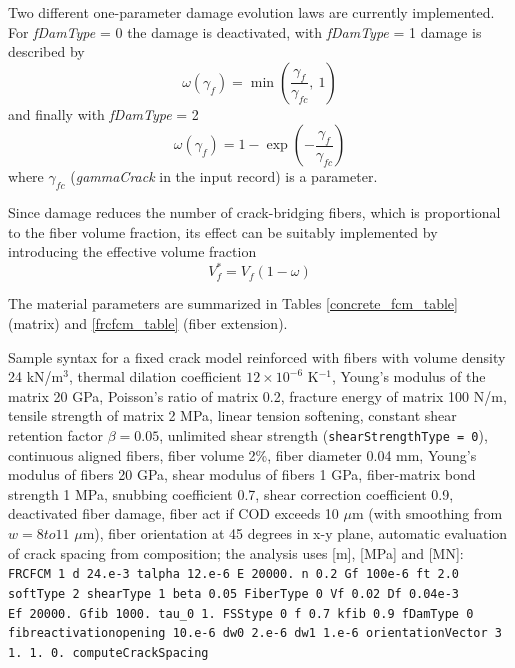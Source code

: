 \documentclass[a4paper]{article}
\newcommand{\param}[1]{{\it #1}}
\begin{document}
Two different one-parameter damage evolution laws are currently implemented. For \param{fDamType} = 0 the damage is deactivated, with \param{fDamType} = 1 damage is described by
\begin{equation}
  \omega(\gamma_f) = \min \left( \frac{\gamma_f}{\gamma_{fc}},\: 1 \right)
\end{equation}
and finally with \param{fDamType} = 2
\begin{equation}
  \omega(\gamma_f) = 1 - \exp \left( - \frac{\gamma_f}{\gamma_{fc}} \right)
\end{equation}
%
where $\gamma_{fc}$ (\param{gammaCrack} in the input record) is a parameter.

 Since damage reduces the number of crack-bridging fibers, which is proportional to the fiber volume fraction, its effect can be suitably implemented by introducing the effective volume fraction
%
\begin{equation}
V_f^{\ast} = V_f (1-\omega)
\end{equation}



The material parameters are summarized in Tables \ref{concrete_fcm_table} (matrix) and \ref{frcfcm_table} (fiber extension).

Sample syntax for a fixed crack model reinforced with fibers with volume density 24 kN/m$^3$, thermal dilation coefficient $12\times10^{-6}$ K$^{-1}$, Young's modulus of the matrix 20 GPa, Poisson's ratio of matrix 0.2, fracture energy of matrix 100 N/m, tensile strength of matrix 2 MPa, linear tension softening, constant shear retention factor $\beta = 0.05$, unlimited shear strength (\texttt{shearStrengthType = 0}), continuous aligned fibers, fiber volume 2\%, fiber diameter 0.04 mm, Young's modulus of fibers 20 GPa, shear modulus of fibers 1 GPa, fiber-matrix bond strength 1 MPa, snubbing coefficient 0.7, shear correction coefficient 0.9, deactivated fiber damage, fiber act if COD exceeds 10 $\mu$m (with smoothing from $w = 8 to 11$ $\mu$m), fiber orientation at 45 degrees in x-y plane, automatic evaluation of crack spacing from composition; the analysis uses [m], [MPa] and [MN]:\\
\texttt{FRCFCM 1 d 24.e-3 talpha 12.e-6 E 20000.~n 0.2 Gf 100e-6 ft 2.0 \\softType 2 shearType 1 beta 0.05 FiberType 0 Vf 0.02 Df 0.04e-3\\ Ef 20000.~Gfib 1000.~tau\_0 1.~FSStype 0  f 0.7 kfib 0.9 fDamType 0 \\ fibreactivationopening 10.e-6 dw0 2.e-6 dw1 1.e-6 orientationVector 3 1.~1.~0.~computeCrackSpacing}
\end{document}
